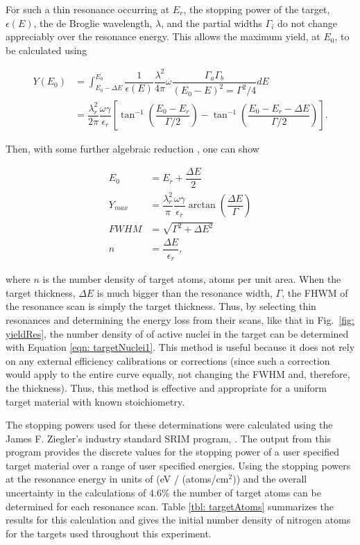 For such a thin resonance occurring at $E_{r}$, the stopping power of the target, $\epsilon(E)$, the de Broglie wavelength, $\lambda$, and the partial widths $\Gamma_{i}$ do not change appreciably over the resonance energy. This allows the maximum yield, at $E_{0}$, to be calculated using \cite{IliadisBook}

\begin{align}
Y(E_{0}) &= \int_{E_{0}-\Delta E}^{E_{0}} \dfrac{1}{\epsilon(E)} \dfrac{\lambda^{2}}{4 \pi} \omega \dfrac{\Gamma_{a}\Gamma_{b}}{(E_{0}-E)^{2} = \Gamma^{2}/4} dE \\
           &= \dfrac{\lambda_{r}^{2}}{2 \pi} \dfrac{\omega \gamma}{\epsilon_{r}} \left[ \tan^{-1} \left(\dfrac{E_{0} - E_{r}}{\Gamma/2}  \right) - \tan^{-1} \left(  \dfrac{E_{0} - E_{r} - \Delta E}{\Gamma/2} \right)  \right].
\end{align}

Then, with some further algebraic reduction \cite{IliadisBook}, one can show

\begin{align}
E_{0} &= E_{r} + \dfrac{\Delta E}{2} \\
 Y_{max} &= \dfrac{\lambda_{r}^{2}}{\pi} \dfrac{\omega \gamma}{\epsilon_{r}} \arctan \left(\dfrac{\Delta E}{\Gamma} \right) \\
 FWHM &= \sqrt{\Gamma^{2} + \Delta E^{2}} \\
 n &= \dfrac{\Delta E}{\epsilon_{r}}, \label{eqn: targetNuclei1}
\end{align}

\noindent where $n$ is the number density of target atoms, atoms per unit area. When the target thickness, $\Delta E$ is much bigger than the resonance width, $\Gamma$, the FHWM of the resonance scan is simply the target thickness. Thus, by selecting thin resonances and determining the energy loss from their scans, like that in Fig.\ \ref{fig: yieldRes}, the number density of of active nuclei in the target can be determined with Equation \ref{eqn: targetNuclei1}. This method is useful because it does not rely on any external efficiency calibrations or corrections (since such a correction would apply to the entire curve equally, not changing the FWHM and, therefore, the thickness). Thus, this method is effective and appropriate for a uniform target material with known stoichiometry. 

The stopping powers used for these determinations were calculated using the James F. Ziegler's industry standard SRIM program, \cite{Ziegler2010}. The output from this program provides the discrete values for the stopping power of a user specified target material over a range of user specified energies. Using the stopping powers at the resonance energy in units of (eV / (atoms/cm$^{2}$)) and the overall uncertainty in the calculations of 4.6\% \cite{Ziegler2010} the number of target atoms can be determined for each resonance scan. Table \ref{tbl: targetAtoms} summarizes the results for this calculation and gives the initial number density of nitrogen atoms for the targets used throughout this experiment. 



